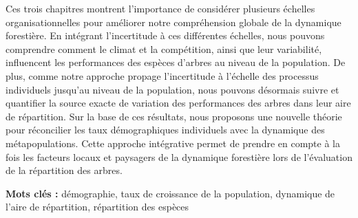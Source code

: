 Ces trois chapitres montrent l'importance de considérer plusieurs échelles organisationnelles pour améliorer notre compréhension globale de la dynamique forestière. En intégrant l'incertitude à ces différentes échelles, nous pouvons comprendre comment le climat et la compétition, ainsi que leur variabilité, influencent les performances des espèces d'arbres au niveau de la population. De plus, comme notre approche propage l'incertitude à l'échelle des processus individuels jusqu'au niveau de la population, nous pouvons désormais suivre et quantifier la source exacte de variation des performances des arbres dans leur aire de répartition. Sur la base de ces résultats, nous proposons une nouvelle théorie pour réconcilier les taux démographiques individuels avec la dynamique des métapopulations. Cette approche intégrative permet de prendre en compte à la fois les facteurs locaux et paysagers de la dynamique forestière lors de l'évaluation de la répartition des arbres.

\textbf{Mots clés :} démographie, taux de croissance de la population, dynamique de l'aire de répartition, répartition des espèces


